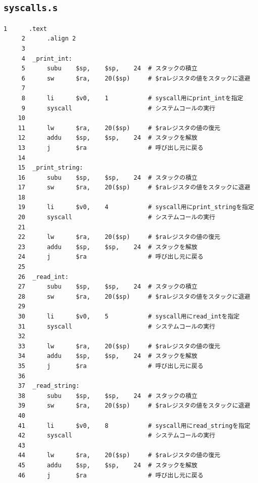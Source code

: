 \subsection{\texttt{syscalls.s}} \label{sec:syscall}
\begin{Verbatim}[fontsize=\small, baselinestretch=0.8]
     1      .text
     2      .align 2
     3
     4  _print_int:
     5      subu    $sp,    $sp,    24  # スタックの積立
     6      sw      $ra,    20($sp)     # $raレジスタの値をスタックに退避
     7
     8      li      $v0,    1           # syscall用にprint_intを指定
     9      syscall                     # システムコールの実行
    10
    11      lw      $ra,    20($sp)     # $raレジスタの値の復元
    12      addu    $sp,    $sp,    24  # スタックを解放
    13      j       $ra                 # 呼び出し元に戻る
    14
    15  _print_string:
    16      subu    $sp,    $sp,    24  # スタックの積立
    17      sw      $ra,    20($sp)     # $raレジスタの値をスタックに退避
    18
    19      li      $v0,    4           # syscall用にprint_stringを指定
    20      syscall                     # システムコールの実行
    21
    22      lw      $ra,    20($sp)     # $raレジスタの値の復元
    23      addu    $sp,    $sp,    24  # スタックを解放
    24      j       $ra                 # 呼び出し元に戻る
    25
    26  _read_int:
    27      subu    $sp,    $sp,    24  # スタックの積立
    28      sw      $ra,    20($sp)     # $raレジスタの値をスタックに退避
    29
    30      li      $v0,    5           # syscall用にread_intを指定
    31      syscall                     # システムコールの実行
    32
    33      lw      $ra,    20($sp)     # $raレジスタの値の復元
    34      addu    $sp,    $sp,    24  # スタックを解放
    35      j       $ra                 # 呼び出し元に戻る
    36
    37  _read_string:
    38      subu    $sp,    $sp,    24  # スタックの積立
    39      sw      $ra,    20($sp)     # $raレジスタの値をスタックに退避
    40
    41      li      $v0,    8           # syscall用にread_stringを指定
    42      syscall                     # システムコールの実行
    43
    44      lw      $ra,    20($sp)     # $raレジスタの値の復元
    45      addu    $sp,    $sp,    24  # スタックを解放
    46      j       $ra                 # 呼び出し元に戻る
\end{Verbatim}

